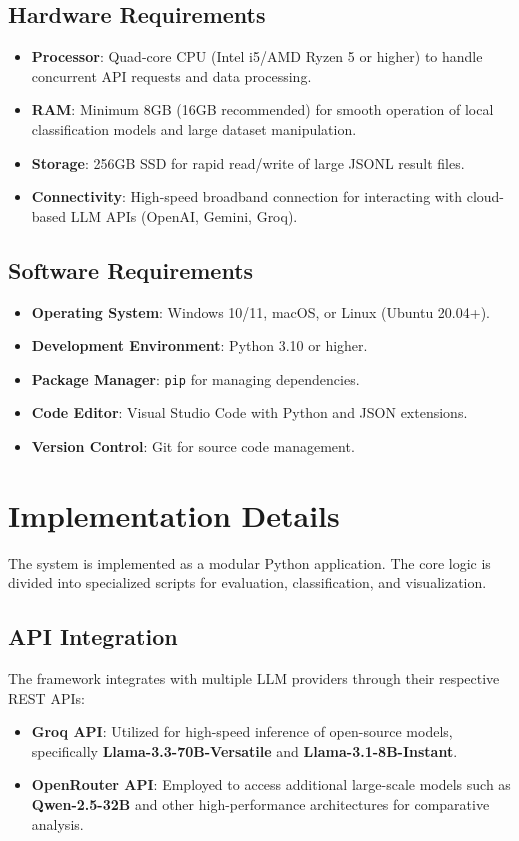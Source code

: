 \documentclass[12pt, a4paper, onecolumn]{report}
\begin{document}
\subsection{Hardware Requirements}
\begin{itemize}
    \item \textbf{Processor}: Quad-core CPU (Intel i5/AMD Ryzen 5 or higher) to handle concurrent API requests and data processing.
    \item \textbf{RAM}: Minimum 8GB (16GB recommended) for smooth operation of local classification models and large dataset manipulation.
    \item \textbf{Storage}: 256GB SSD for rapid read/write of large JSONL result files.
    \item \textbf{Connectivity}: High-speed broadband connection for interacting with cloud-based LLM APIs (OpenAI, Gemini, Groq).
\end{itemize}

\subsection{Software Requirements}
\begin{itemize}
    \item \textbf{Operating System}: Windows 10/11, macOS, or Linux (Ubuntu 20.04+).
    \item \textbf{Development Environment}: Python 3.10 or higher.
    \item \textbf{Package Manager}: \texttt{pip} for managing dependencies.
    \item \textbf{Code Editor}: Visual Studio Code with Python and JSON extensions.
    \item \textbf{Version Control}: Git for source code management.
\end{itemize}

\section{Implementation Details}
The system is implemented as a modular Python application. The core logic is divided into specialized scripts for evaluation, classification, and visualization.

\subsection{API Integration}
The framework integrates with multiple LLM providers through their respective REST APIs:
\begin{itemize}
    \item \textbf{Groq API}: Utilized for high-speed inference of open-source models, specifically \textbf{Llama-3.3-70B-Versatile} and \textbf{Llama-3.1-8B-Instant}.
    \item \textbf{OpenRouter API}: Employed to access additional large-scale models such as \textbf{Qwen-2.5-32B} and other high-performance architectures for comparative analysis.
\end{itemize}
\end{document}
